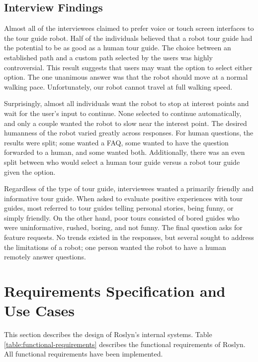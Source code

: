 \documentclass[11pt]{report}
\begin{document}
\subsection{Interview Findings}
Almost all of the interviewees claimed to prefer voice or touch screen interfaces to the tour guide robot. Half of the individuals believed that a robot tour guide had the potential to be as good as a human tour guide. The choice between an established path and a custom path selected by the users was highly controversial. This result suggests that users may want the option to select either option. The one unanimous answer was that the robot should move at a normal walking pace. Unfortunately, our robot cannot travel at full walking speed. 

Surprisingly, almost all individuals want the robot to stop at interest points and wait for the user’s input to continue. None selected to continue automatically, and only a couple wanted the robot to slow near the interest point. The desired humanness of the robot varied greatly across responses. For human questions, the results were split; some wanted a FAQ, some wanted to have the question forwarded to a human, and some wanted both. Additionally, there was an even split between who would select a human tour guide versus a robot tour guide given the option. 

Regardless of the type of tour guide, interviewees wanted a primarily friendly and informative tour guide. When asked to evaluate positive experiences with tour guides, most referred to tour guides telling personal stories, being funny, or simply friendly. On the other hand, poor tours consisted of bored guides who were uninformative, rushed, boring, and not funny. The final question asks for feature requests. No trends existed in the responses, but several sought to address the limitations of a robot; one person wanted the robot to have a human remotely answer questions.

\section{Requirements Specification and Use Cases}
This section describes the design of Roslyn’s internal systems. Table \ref{table:functional-requirements} describes the functional requirements of Roslyn. All functional requirements have been implemented.
\end{document}
